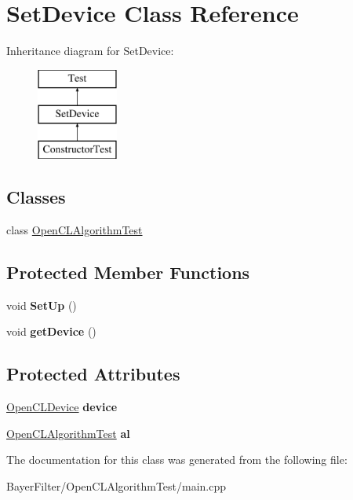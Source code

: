 \hypertarget{class_set_device}{\section{Set\-Device Class Reference}
\label{class_set_device}
}
Inheritance diagram for Set\-Device\-:\begin{figure}[H]
\begin{center}
\leavevmode
\includegraphics[height=3.000000cm]{class_set_device}
\end{center}
\end{figure}
\subsection*{Classes}
\begin{DoxyCompactItemize}
\item 
class \hyperlink{class_set_device_1_1_open_c_l_algorithm_test}{Open\-C\-L\-Algorithm\-Test}
\end{DoxyCompactItemize}
\subsection*{Protected Member Functions}
\begin{DoxyCompactItemize}
\item 
\hypertarget{class_set_device_aa97dd999e5fef6267661e2ceb1fc8bb9}{void {\bfseries Set\-Up} ()}\label{class_set_device_aa97dd999e5fef6267661e2ceb1fc8bb9}

\item 
\hypertarget{class_set_device_aaca942eab00f34a872873fc81db92ac4}{void {\bfseries get\-Device} ()}\label{class_set_device_aaca942eab00f34a872873fc81db92ac4}

\end{DoxyCompactItemize}
\subsection*{Protected Attributes}
\begin{DoxyCompactItemize}
\item 
\hypertarget{class_set_device_a7f784d6113216dcda50e74514b977cfc}{\hyperlink{class_open_c_l_device}{Open\-C\-L\-Device} {\bfseries device}}\label{class_set_device_a7f784d6113216dcda50e74514b977cfc}

\item 
\hypertarget{class_set_device_a26595a93782b543ae9bc42d44ee9ff54}{\hyperlink{class_set_device_1_1_open_c_l_algorithm_test}{Open\-C\-L\-Algorithm\-Test} {\bfseries al}}\label{class_set_device_a26595a93782b543ae9bc42d44ee9ff54}

\end{DoxyCompactItemize}


The documentation for this class was generated from the following file\-:\begin{DoxyCompactItemize}
\item 
Bayer\-Filter/\-Open\-C\-L\-Algorithm\-Test/main.\-cpp\end{DoxyCompactItemize}

